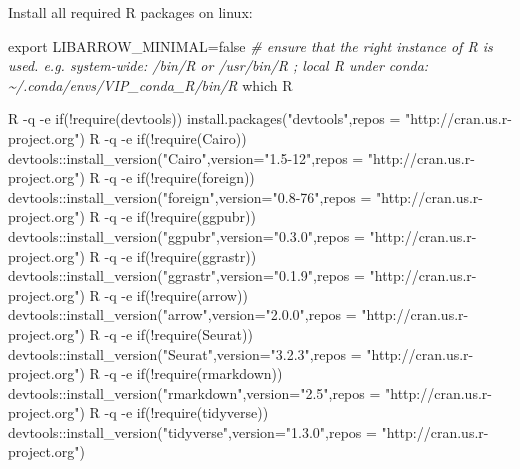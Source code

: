 \documentclass[
]{book}
\newenvironment{Shaded}{\begin{snugshade}}{\end{snugshade}}
\newcommand{\CommentTok}[1]{\textcolor[rgb]{0.56,0.35,0.01}{\textit{#1}}}
\newcommand{\NormalTok}[1]{#1}
\newcommand{\OtherTok}[1]{\textcolor[rgb]{0.56,0.35,0.01}{#1}}
\newcommand{\SpecialCharTok}[1]{\textcolor[rgb]{0.00,0.00,0.00}{#1}}
\newcommand{\StringTok}[1]{\textcolor[rgb]{0.31,0.60,0.02}{#1}}
\begin{document}
Install all required R packages on linux:

\begin{Shaded}
\begin{Highlighting}[]
\NormalTok{export LIBARROW\_MINIMAL}\OtherTok{=}\NormalTok{false}
\CommentTok{\#  ensure that the right instance of R is used. e.g. system{-}wide: /bin/R or /usr/bin/R ; local R under conda: \textasciitilde{}/.conda/envs/VIP\_conda\_R/bin/R}
\NormalTok{which R}

\NormalTok{R }\SpecialCharTok{{-}}\NormalTok{q }\SpecialCharTok{{-}}\NormalTok{e }\StringTok{\textquotesingle{}if(!require(devtools)) install.packages("devtools",repos = "http://cran.us.r{-}project.org")\textquotesingle{}}
\NormalTok{R }\SpecialCharTok{{-}}\NormalTok{q }\SpecialCharTok{{-}}\NormalTok{e }\StringTok{\textquotesingle{}if(!require(Cairo)) devtools::install\_version("Cairo",version="1.5{-}12",repos = "http://cran.us.r{-}project.org")\textquotesingle{}}
\NormalTok{R }\SpecialCharTok{{-}}\NormalTok{q }\SpecialCharTok{{-}}\NormalTok{e }\StringTok{\textquotesingle{}if(!require(foreign)) devtools::install\_version("foreign",version="0.8{-}76",repos = "http://cran.us.r{-}project.org")\textquotesingle{}}
\NormalTok{R }\SpecialCharTok{{-}}\NormalTok{q }\SpecialCharTok{{-}}\NormalTok{e }\StringTok{\textquotesingle{}if(!require(ggpubr)) devtools::install\_version("ggpubr",version="0.3.0",repos = "http://cran.us.r{-}project.org")\textquotesingle{}}
\NormalTok{R }\SpecialCharTok{{-}}\NormalTok{q }\SpecialCharTok{{-}}\NormalTok{e }\StringTok{\textquotesingle{}if(!require(ggrastr)) devtools::install\_version("ggrastr",version="0.1.9",repos = "http://cran.us.r{-}project.org")\textquotesingle{}}
\NormalTok{R }\SpecialCharTok{{-}}\NormalTok{q }\SpecialCharTok{{-}}\NormalTok{e }\StringTok{\textquotesingle{}if(!require(arrow)) devtools::install\_version("arrow",version="2.0.0",repos = "http://cran.us.r{-}project.org")\textquotesingle{}}
\NormalTok{R }\SpecialCharTok{{-}}\NormalTok{q }\SpecialCharTok{{-}}\NormalTok{e }\StringTok{\textquotesingle{}if(!require(Seurat)) devtools::install\_version("Seurat",version="3.2.3",repos = "http://cran.us.r{-}project.org")\textquotesingle{}}
\NormalTok{R }\SpecialCharTok{{-}}\NormalTok{q }\SpecialCharTok{{-}}\NormalTok{e }\StringTok{\textquotesingle{}if(!require(rmarkdown)) devtools::install\_version("rmarkdown",version="2.5",repos = "http://cran.us.r{-}project.org")\textquotesingle{}}
\NormalTok{R }\SpecialCharTok{{-}}\NormalTok{q }\SpecialCharTok{{-}}\NormalTok{e }\StringTok{\textquotesingle{}if(!require(tidyverse)) devtools::install\_version("tidyverse",version="1.3.0",repos = "http://cran.us.r{-}project.org")\textquotesingle{}}

\end{Highlighting}
\end{Shaded}
\end{document}
